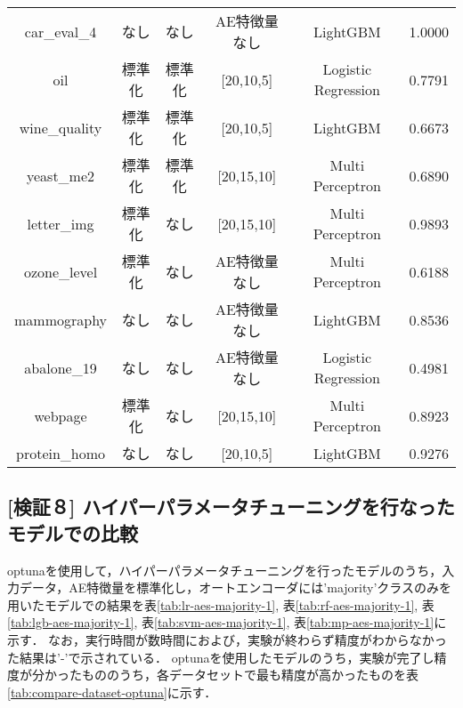 \begin{table}[htbp]
\begin{tabular}{cccccc}
        car\_eval\_4 & なし & なし & AE特徴量なし & LightGBM & 1.0000\\
        oil & 標準化 & 標準化 & [20,10,5] & Logistic Regression & 0.7791\\
        wine\_quality & 標準化 & 標準化 & [20,10,5] & LightGBM & 0.6673\\
        yeast\_me2 & 標準化 & 標準化 & [20,15,10] & Multi Perceptron & 0.6890\\
        letter\_img & 標準化 & なし & [20,15,10] & Multi Perceptron & 0.9893\\
        ozone\_level & 標準化 & なし & AE特徴量なし & Multi Perceptron & 0.6188\\
        mammography & なし & なし & AE特徴量なし & LightGBM & 0.8536\\
        abalone\_19 & なし & なし & AE特徴量なし & Logistic Regression & 0.4981\\
        webpage & 標準化 & なし & [20,15,10] & Multi Perceptron & 0.8923\\
        protein\_homo & なし & なし & [20,10,5] & LightGBM & 0.9276\\
        \hline

    \end{tabular}
\end{table}

\subsection{[検証８] ハイパーパラメータチューニングを行なったモデルでの比較}
optunaを使用して，ハイパーパラメータチューニングを行ったモデルのうち，入力データ，AE特徴量を標準化し，オートエンコーダには'majority'クラスのみを用いたモデルでの結果を表\ref{tab:lr-aes-majority-1}, 表\ref{tab:rf-aes-majority-1}, 表\ref{tab:lgb-aes-majority-1}, 表\ref{tab:svm-aes-majority-1}, 表\ref{tab:mp-aes-majority-1}に示す．
なお，実行時間が数時間におよび，実験が終わらず精度がわからなかった結果は'-'で示されている．
optunaを使用したモデルのうち，実験が完了し精度が分かったもののうち，各データセットで最も精度が高かったものを表\ref{tab:compare-dataset-optuna}に示す．

